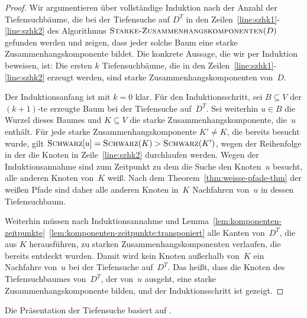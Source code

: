 \begin{proof}
Wir argumentieren über vollständige Induktion nach der Anzahl der Tiefensuchbäume, die bei der Tiefensuche auf $D^T$ in den Zeilen~\ref{line:szhk1}-\ref{line:szhk2} des Algorithmus $\mathop{\text{\textsc{Starke-Zusammenhangskomponenten}}}(D)$ gefunden werden und zeigen, dass jeder solche Baum eine starke Zusammenhangskomponente bildet.
Die konkrete Aussage, die wir per Induktion beweisen, ist: \glqq Die ersten $k$ Tiefensuchbäume, die in den Zeilen~\ref{line:szhk1}-\ref{line:szhk2} erzeugt werden, sind starke Zusammenhangskomponenten von~$D$.\grqq

Der Induktionsanfang ist mit $k=0$ klar.
Für den Induktionsschritt, sei $B \subseteq V$ der $(k+1)$-te erzeugte Baum bei der Tiefensuche auf~$D^T$.
Sei weiterhin $u \in B$ die Wurzel dieses Baumes und $K \subseteq V$ die starke Zusammenhangskomponente, die~$u$ enthält.
Für jede starke Zusammenhangskomponente $K' \neq K$, die bereits besucht wurde, gilt $\mathop{\text{\textsc{Schwarz}}}[u] = \mathop{\text{\textsc{Schwarz}}}(K) > \mathop{\text{\textsc{Schwarz}}}(K')$, wegen der Reihenfolge in der die Knoten in Zeile~\ref{line:szhk2} durchlaufen werden.
Wegen der Induktionsannahme sind zum Zeitpunkt zu dem die Suche den Knoten~$u$ besucht, alle anderen Knoten von~$K$ weiß.
Nach dem Theorem~\ref{thm:weisse-pfade-thm} der weißen Pfade sind daher alle anderen Knoten in~$K$ Nachfahren von~$u$ in dessen Tiefensuchbaum.

Weiterhin müssen nach Induktionsannahme und Lemma~\ref{lem:komponenten-zeitpunkte}~\ref{lem:komponenten-zeitpunkte:transponiert} alle Kanten von~$D^T$, die aus $K$ herausführen, zu starken Zusammenhangskomponenten verlaufen, die bereits entdeckt wurden.
Damit wird kein Knoten außerhalb von~$K$ ein Nachfahre von~$u$ bei der Tiefensuche auf~$D^T$.
Das heißt, dass die Knoten des Tiefensuchbaumes von~$D^T$, der von~$u$ ausgeht, eine starke Zusammenhangskomponente bilden, und der Induktionsschritt ist gezeigt.
\end{proof}


\begin{bem}
	Die Präsentation der Tiefensuche basiert auf  \cite{CLRS17}.
\end{bem} 
